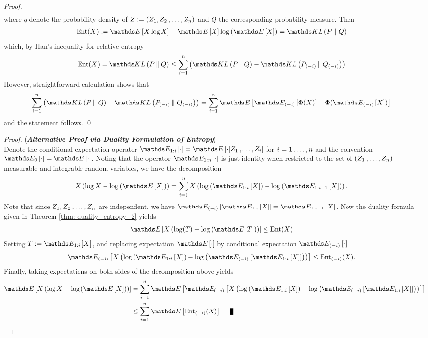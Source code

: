 \documentclass[11pt]{article}
\begin{document}
\begin{itemize}
\begin{proof}
\begin{align*}
\end{align*} where $q$ denote the probability density of $Z:= (Z_1, Z_2 \,{,}\ldots{,}\, Z_n)$ and $Q$ the corresponding probability measure. Then 
\begin{align*}
\text{Ent}(X)&:= \E{}{X\log X} - \E{}{X}\log\paren{\E{}{X}} = \kl{P}{Q}
\end{align*} which, by Han's inequality for relative entropy
\begin{align*}
\text{Ent}(X) = \kl{P}{Q}& \le \sum_{i=1}^{n}\paren{\kl{P}{Q} - \kl{P_{(-i)}}{Q_{(-i)}}} 
\end{align*} However, straightforward calculation shows that
\begin{align*}
\sum_{i=1}^{n}\paren{\kl{P}{Q} - \kl{P_{(-i)}}{Q_{(-i)}}} &=  \sum_{i=1}^{n}\E{}{\E{(-i)}{\Phi(X)} - \Phi(\E{(-i)}{X})}
\end{align*} and the statement follows. \qed
\end{proof}
\begin{proof} (\emph{\textbf{Alternative Proof via Duality Formulation of Entropy}})\\
Denote the conditional expectation operator $\E{1:i}{\cdot} = \E{}{\cdot | Z_1 \xdotx{,} Z_i}$ for $i=1 \,{,}\ldots{,}\, n$ and the convention $\E{0}{\cdot} = \E{}{\cdot}$. Noting that the operator $\E{1:n}{\cdot}$ is just identity when restricted to the set of $(Z_1 \,{,}\ldots{,}\, Z_n)$-measurable and integrable random variables, we have the decomposition
\begin{align*}
X \paren{\log X - \log\paren{\E{}{X}}} &= \sum_{i=1}^{n}X \paren{\log\paren{\E{1:i}{X}} - \log\paren{\E{1:i-1}{X}}}.
\end{align*} Note that since $Z_1, Z_2 \,{,}\ldots{,}\, Z_n$  are independent, we have $\E{(-i)}{\E{1:i}{X}} = \E{1:i-1}{X}$.
Now the duality formula given in Theorem \ref{thm: duality_entropy_2} yields
\begin{align*}
\E{}{X \paren{\log(T) - \log\paren{\E{}{T}}}} &\le \text{Ent}(X)
\end{align*} Setting $T:= \E{1:i}{X}$, and replacing expectation $\E{}{\cdot}$ by conditional expectation $\E{(-i)}{\cdot}$
\begin{align*}
\E{(-i)}{X \paren{\log\paren{\E{1:i}{X}} - \log\paren{\E{(-i)}{\E{1:i}{X}}}}} &\le \text{Ent}_{(-i)}(X).
\end{align*} Finally, taking expectations on both sides of the decomposition above yields 
\begin{align*}
\E{}{X \paren{\log X - \log\paren{\E{}{X}}}} &= \sum_{i=1}^{n}\E{}{\E{(-i)}{X \paren{\log\paren{\E{1:i}{X}} - \log\paren{\E{(-i)}{\E{1:i}{X}}}}}} \\
&\le \sum_{i=1}^{n}\E{}{\text{Ent}_{(-i)}(X)} \qed
\end{align*}
\end{proof}


\end{itemize}
\end{document}
